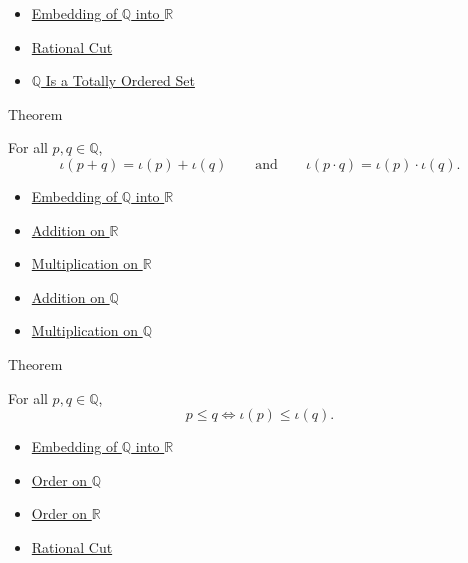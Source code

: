 \begin{dependencies}
\begin{itemize}
  \item \hyperref[def:real-chapter-embedding-q-into-r]{Embedding of $\mathbb{Q}$ into $\mathbb{R}$}
  \item \hyperref[def:rational-cut]{Rational Cut}
  \item \hyperref[thm:q-totally-ordered-set]{$\mathbb{Q}$ Is a Totally Ordered Set}
\end{itemize}
\end{dependencies}

\begin{theorembox}{Theorem}
\begin{theorem}
\label{thm:embedding-q-into-r-preserves-arithmetic}
For all $p,q\in\mathbb{Q}$,
\[
\iota(p+q)=\iota(p)+\iota(q)
\qquad\text{and}\qquad
\iota(p\cdot q)=\iota(p)\cdot\iota(q).
\]
\end{theorem}
\end{theorembox}

\begin{dependencies}
\begin{itemize}
  \item \hyperref[def:real-chapter-embedding-q-into-r]{Embedding of $\mathbb{Q}$ into $\mathbb{R}$}
  \item \hyperref[def:addition-on-r]{Addition on $\mathbb{R}$}
  \item \hyperref[def:multiplication-on-r]{Multiplication on $\mathbb{R}$}
  \item \hyperref[def:addition-on-q-classes]{Addition on $\mathbb{Q}$}
  \item \hyperref[def:multiplication-on-q-classes]{Multiplication on $\mathbb{Q}$}
\end{itemize}
\end{dependencies}

\begin{theorembox}{Theorem}
\begin{theorem}
\label{thm:embedding-q-into-r-preserves-order}
For all $p,q\in\mathbb{Q}$,
\[
p\le q \Longleftrightarrow \iota(p)\le\iota(q).
\]
\end{theorem}
\end{theorembox}

\begin{dependencies}
\begin{itemize}
  \item \hyperref[def:real-chapter-embedding-q-into-r]{Embedding of $\mathbb{Q}$ into $\mathbb{R}$}
  \item \hyperref[def:order-on-q]{Order on $\mathbb{Q}$}
  \item \hyperref[def:order-on-r]{Order on $\mathbb{R}$}
  \item \hyperref[def:rational-cut]{Rational Cut}
\end{itemize}
\end{dependencies}

